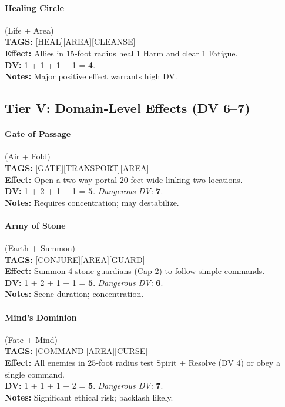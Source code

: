 \paragraph{Healing Circle} (Life + Area) \\
\textbf{TAGS:} {[HEAL][AREA][CLEANSE]} \\
\textbf{Effect:} Allies in 15‑foot radius heal 1 Harm and clear 1 Fatigue. \\
\textbf{DV:} 1 + 1 + 1 + 1 = \textbf{4}. \\
\textbf{Notes:} Major positive effect warrants high DV.

\subsection{Tier V: Domain‑Level Effects (DV 6--7)}

\paragraph{Gate of Passage} (Air + Fold) \\
\textbf{TAGS:} {[GATE][TRANSPORT][AREA]} \\
\textbf{Effect:} Open a two‑way portal 20 feet wide linking two locations. \\
\textbf{DV:} 1 + 2 + 1 + 1 = \textbf{5}. \emph{Dangerous DV:} \textbf{7}. \\
\textbf{Notes:} Requires concentration; may destabilize.

\paragraph{Army of Stone} (Earth + Summon) \\
\textbf{TAGS:} {[CONJURE][AREA][GUARD]} \\
\textbf{Effect:} Summon 4 stone guardians (Cap 2) to follow simple commands. \\
\textbf{DV:} 1 + 2 + 1 + 1 = \textbf{5}. \emph{Dangerous DV:} \textbf{6}. \\
\textbf{Notes:} Scene duration; concentration.

\paragraph{Mind's Dominion} (Fate + Mind) \\
\textbf{TAGS:} {[COMMAND][AREA][CURSE]} \\
\textbf{Effect:} All enemies in 25‑foot radius test Spirit + Resolve (DV 4) or obey a single command. \\
\textbf{DV:} 1 + 1 + 1 + 2 = \textbf{5}. \emph{Dangerous DV:} \textbf{7}. \\
\textbf{Notes:} Significant ethical risk; backlash likely.

